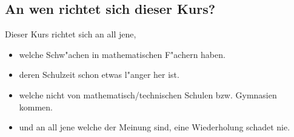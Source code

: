 \subsection{An wen richtet sich dieser Kurs?}
Dieser Kurs richtet sich an all jene,
\begin{itemize}
\item welche Schw"achen in mathematischen F"achern haben.
\item deren Schulzeit schon etwas l"anger her ist.
\item welche nicht von mathematisch/technischen Schulen bzw. Gymnasien kommen.
\item und an all jene welche der Meinung sind, eine Wiederholung schadet nie.
\end{itemize}